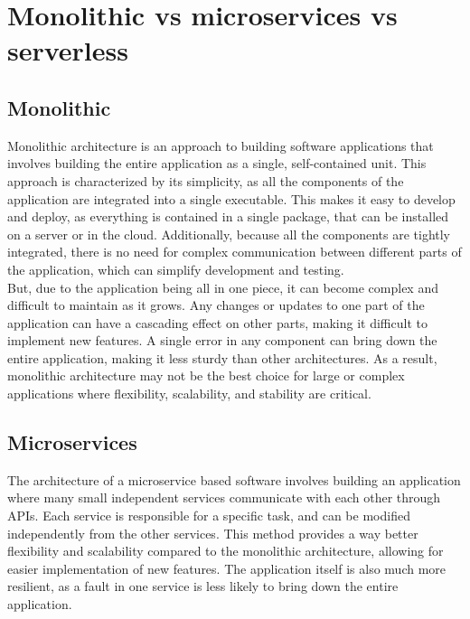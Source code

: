 \section{Monolithic vs microservices vs serverless}

\subsection{Monolithic}

\noindent
Monolithic architecture is an approach to building software applications that involves building the entire application as a single, self-contained unit. This approach is characterized by its simplicity, as all the components of the application are integrated into a single executable. This makes it easy to develop and deploy, as everything is contained in a single package, that can be installed on a server or in the cloud. Additionally, because all the components are tightly integrated, there is no need for complex communication between different parts of the application, which can simplify development and testing. \cite{agileacademy_monolithic_arch} \\

\noindent
But, due to the application being all in one piece, it can become complex and difficult to maintain as it grows. Any changes or updates to one part of the application can have a cascading effect on other parts, making it difficult to implement new features. A single error in any component can bring down the entire application, making it less sturdy than other architectures. As a result, monolithic architecture may not be the best choice for large or complex applications where flexibility, scalability, and stability are critical. \\

\subsection{Microservices}

The architecture of a microservice based software involves building an application where many small independent services communicate with each other through APIs. Each service is responsible for a specific task, and can be modified independently from the other services. This method provides a way better flexibility and scalability compared to the monolithic architecture, allowing for easier implementation of new features. \cite{atlassian_microservices} The application itself is also much more resilient, as a fault in one service is less likely to bring down the entire application. \\

